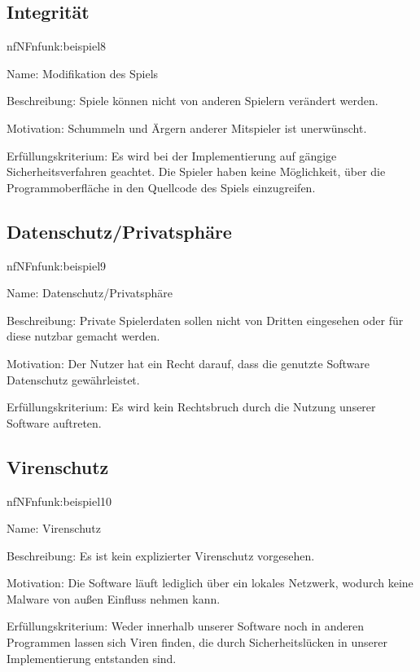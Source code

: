 \subsection{Integrität}

\begin{description}[leftmargin=5em, style=sameline]	
	\begin{lhp}{nf}{NF}{nfunk:beispiel8}
		\item [Name:] Modifikation des Spiels
		\item [Beschreibung:] Spiele können nicht von anderen Spielern verändert werden.
		\item [Motivation:] Schummeln und Ärgern anderer Mitspieler ist unerwünscht.
		\item [Erfüllungskriterium:] Es wird bei der Implementierung auf gängige Sicherheitsverfahren geachtet. Die Spieler haben keine Möglichkeit, über die Programmoberfläche in den Quellcode des Spiels einzugreifen. 
	\end{lhp}
\end{description}

\subsection{Datenschutz/Privatsphäre}

\begin{description}[leftmargin=5em, style=sameline]	
	\begin{lhp}{nf}{NF}{nfunk:beispiel9}
		\item [Name:] Datenschutz/Privatsphäre
		\item [Beschreibung:] Private Spielerdaten sollen nicht von Dritten eingesehen oder für diese nutzbar gemacht werden.
		\item [Motivation:] Der Nutzer hat ein Recht darauf, dass die genutzte Software Datenschutz gewährleistet.
		\item [Erfüllungskriterium:] Es wird kein Rechtsbruch durch die Nutzung unserer Software auftreten.
	\end{lhp}
\end{description}


\subsection{Virenschutz}

\begin{description}[leftmargin=5em, style=sameline]	
	\begin{lhp}{nf}{NF}{nfunk:beispiel10}
		\item [Name:] Virenschutz
		\item [Beschreibung:] Es ist kein explizierter Virenschutz vorgesehen.
		\item [Motivation:] Die Software läuft lediglich über ein lokales Netzwerk, wodurch keine Malware von außen Einfluss nehmen kann.
		\item [Erfüllungskriterium:] Weder innerhalb unserer Software noch in anderen Programmen lassen sich Viren finden, die durch Sicherheitslücken in unserer Implementierung entstanden sind.
	\end{lhp}
\end{description}


